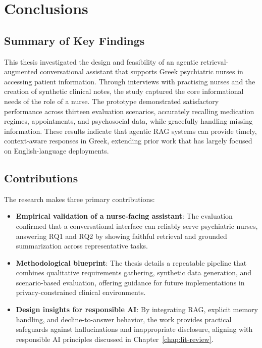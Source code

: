 
\chapter{Conclusions}\label{chap:conclusions}

\ifpdf
    \graphicspath{{Chapter5/Figs/Raster/}{Chapter5/Figs/PDF/}{Chapter5/Figs/}}
\else
    \graphicspath{{Chapter5/Figs/Vector/}{Chapter5/Figs/}}
\fi

\section{Summary of Key Findings}
This thesis investigated the design and feasibility of an agentic retrieval-augmented conversational assistant that supports Greek psychiatric nurses in accessing patient information. Through interviews with practising nurses and the creation of synthetic clinical notes, the study captured the core informational needs of the role of a nurse. The prototype demonstrated satisfactory performance across thirteen evaluation scenarios, accurately recalling medication regimes, appointments, and psychosocial data, while gracefully handling missing information. 
These results indicate that agentic RAG systems can provide timely, context-aware responses in Greek, extending prior work that has largely focused on English-language deployments.


\section{Contributions}
The research makes three primary contributions:
\begin{itemize}
    \item \textbf{Empirical validation of a nurse-facing assistant}: The evaluation confirmed that a conversational interface can reliably serve psychiatric nurses, answering RQ1 and RQ2 by showing faithful retrieval and grounded summarization across representative tasks.
    \item \textbf{Methodological blueprint}: The thesis details a repeatable pipeline that combines qualitative requirements gathering, synthetic data generation, and scenario-based evaluation, offering guidance for future implementations in privacy-constrained clinical environments.
    \item \textbf{Design insights for responsible AI}: By integrating RAG, explicit memory handling, and decline-to-answer behavior, the work provides practical safeguards against hallucinations and inappropriate disclosure, aligning with responsible AI principles discussed in Chapter~\ref{chap:lit-review}.
\end{itemize}

